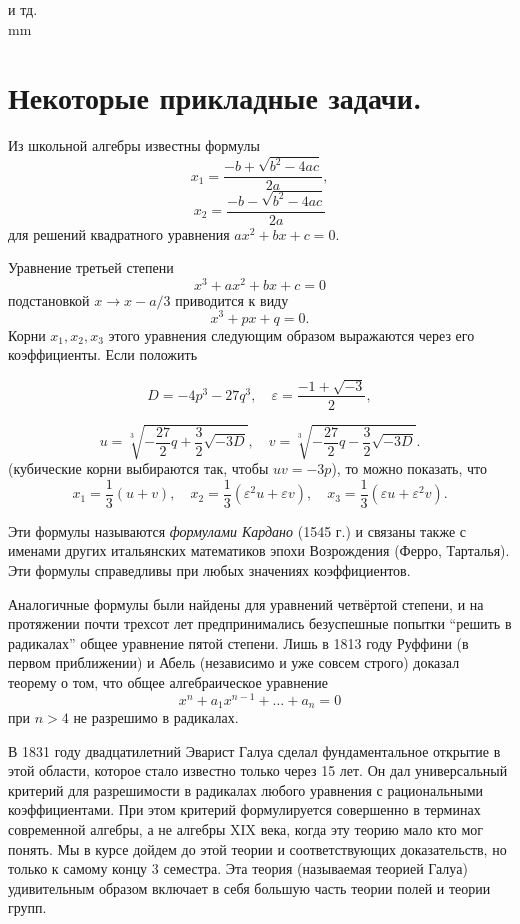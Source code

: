 \documentclass[12pt,english,russian]{article}
\begin{document}
	и тд. \\
	
	 mm
	
	\section{\bf Некоторые прикладные задачи.}

	Из школьной алгебры известны формулы
	$$x_1=\frac{-b+\sqrt{b^2-4ac}}{2a},$$
	$$x_2=\frac{-b-\sqrt{b^2-4ac}}{2a}$$ 
	для решений квадратного уравнения $ax^2+bx+c=0$.
	
	Уравнение третьей степени
	$$x^3+ax^2+bx+c=0$$
	подстановкой $x \to x-a/3$ приводится к виду
	$$x^3+px+q=0.$$
	Корни $x_1, x_2, x_3$
	этого уравнения следующим образом выражаются 
	через его коэффициенты. Если положить
	
	$$
		D=-4p^3-27q^3, \quad \varepsilon=\frac{-1+\sqrt{-3}}{2},
	$$
	
	$$
		u=\sqrt[3]{-\frac{27}{2}q+\frac{3}{2}\sqrt{-3D}}, \quad v=\sqrt[3]{-\frac{27}{2}q-\frac{3}{2}\sqrt{-3D}}.
	$$
	(кубические корни выбираются так, чтобы $uv=-3p$), то можно
	показать, что
	$$x_1=\frac{1}{3}(u+v), \quad x_2=\frac{1}{3}(\varepsilon^2u+\varepsilon v), \quad x_3=\frac{1}{3}(\varepsilon u+\varepsilon^2v).$$
	
	Эти формулы называются
	\textit{формулами Кардано}
	(1545 г.) и связаны 
	также с именами других итальянских математиков эпохи
	Возрождения (Ферро, Тарталья). Эти формулы 
	справедливы при
	любых значениях коэффициентов.
	
	Аналогичные формулы были найдены для уравнений четвёртой 
	степени, и на протяжении почти трехсот лет предпринимались 
	безуспешные попытки “решить в радикалах” общее уравнение 
	пятой степени. Лишь в 1813 году Руффини (в первом приближении) и Абель (независимо и уже совсем строго) доказал
	теорему о том, что общее алгебраическое уравнение
	$$x^n+a_1x^{n-1}+ \dots +a_n=0$$ при $n > 4$
	не разрешимо в радикалах.

	В 1831 году двадцатилетний Эварист Галуа сделал фундаментальное открытие
	 в этой области, которое стало известно только
	через 15 лет. Он дал универсальный критерий для разрешимости в
	радикалах любого уравнения с рациональными коэффициентами.
	При этом критерий формулируется совершенно в терминах современной алгебры, а не алгебры XIX века, когда эту теорию мало
	кто мог понять. Мы в курсе дойдем до этой теории и соответствующих доказательств, но только к самому концу 3 семестра.
	Эта теория (называемая теорией Галуа) удивительным образом
	включает в себя большую часть теории полей и теории групп.
\end{document}
